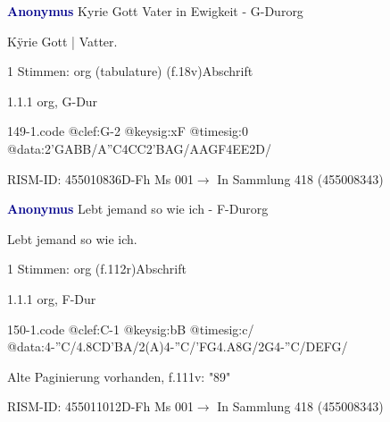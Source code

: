 \documentclass[twocolumn]{book}
\begin{document}
\par \vspace{7pt} \textcolor{darkblue}{\textbf{Anonymus  }}\hfillplus{\textbf{[149]}}\newline Kyrie Gott Vater in Ewigkeit - G-Dur\newline org
\par \begin{itshape}[f.18v, at left:] Kÿrie Gott | Vatter.\end{itshape} 
\par \textcolor{darkblue}{}  1 Stimmen: org (tabulature)  (f.18v)\newline Abschrift
\par 1.1.1  org, G-Dur  
\begin{filecontents*}{149-1.code}
@clef:G-2
@keysig:xF
@timesig:0
@data:2'GABB/A''C4CC2'BAG/AAGF4EE2D/
\end{filecontents*}
\newline
%
\par RISM-ID: 455010836\newline D-Fh  Ms 001\newline $\rightarrow$ In Sammlung 418 (455008343)
      
\par \vspace{7pt} \textcolor{darkblue}{\textbf{Anonymus  }}\hfillplus{\textbf{[150]}}\newline Lebt jemand so wie ich - F-Dur\newline org
\par \begin{itshape} Lebt jemand so wie ich.\end{itshape} 
\par \textcolor{darkblue}{}  1 Stimmen: org  (f.112r)\newline Abschrift
\par 1.1.1  org, F-Dur  
\begin{filecontents*}{150-1.code}
@clef:C-1
@keysig:bB
@timesig:c/
@data:4-''C/4.8CD'BA/2(A)4-''C/'FG4.A8G/2G4-''C/DEFG/
\end{filecontents*}
\newline
%
\par Alte Paginierung vorhanden, f.111v: "89"
\par RISM-ID: 455011012\newline D-Fh  Ms 001\newline $\rightarrow$ In Sammlung 418 (455008343)
      
\end{document}
